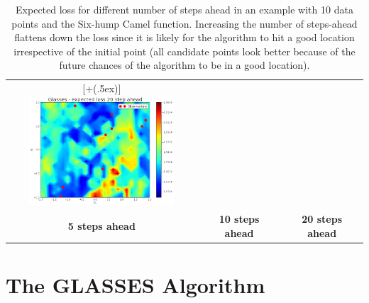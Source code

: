 \documentclass[twoside]{article}
\newcommand*{\addheight}[2][.5ex]{%
  \raisebox{0pt}[\dimexpr\height+(#1)\relax]{#2}%
}
\begin{document}
\begin{table}[t!]
\begin{tabular}{ccc}
      \addheight{\includegraphics[width=54mm]{bo_20steps.png}}\\
      \small \small \textbf{5 steps ahead} & \small \textbf{10 steps ahead} & \small \textbf{20 steps ahead} \\
\end{tabular}\caption{Expected loss for different number of steps ahead in an example with 10 data points and the Six-hump Camel function. Increasing the number of steps-ahead flattens down the loss since it is likely for the algorithm to hit a good location irrespective of the initial point (all candidate points look better because of the future chances of the algorithm to be in a good location).}
\end{table}


 \section{The GLASSES Algorithm}\label{sec:glasses}
\end{document}

